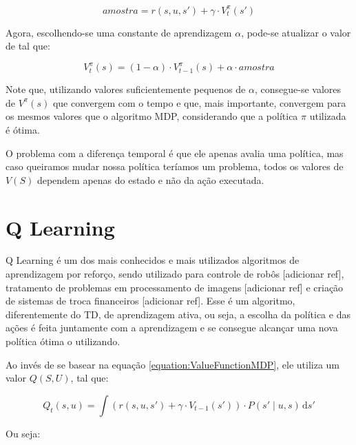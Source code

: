 \begin{equation} \label{equation:AmostraTD}
	amostra = r \left( s, u, s' \right) + \gamma \cdot V_t^\pi \left( s' \right)
\end{equation}

Agora, escolhendo-se uma constante de aprendizagem $ \alpha $, pode-se atualizar o valor de  tal que:

\begin{equation} \label{equation:UpdateValueFunctionTD}
	V_t^\pi \left( s \right) = \left( 1 - \alpha \right) \cdot V_{t-1}^\pi \left( s \right) + \alpha \cdot amostra
\end{equation}

Note que, utilizando valores suficientemente pequenos de $ \alpha $, consegue-se valores de $ V^\pi \left( s \right) $ que convergem com o tempo e que, mais importante, convergem para os mesmos valores que o algoritmo MDP, considerando que a política $ \pi $ utilizada é ótima.

O problema com a diferença temporal é que ele apenas avalia uma política, mas caso queiramos mudar nossa política teríamos um problema, todos os valores de $ V \left( S \right) $ dependem apenas do estado e não da ação executada.

\section{Q Learning}

Q Learning é um dos mais conhecidos e mais utilizados algoritmos de aprendizagem por reforço, sendo utilizado para controle de robôs [adicionar ref], tratamento de problemas em processamento de imagens [adicionar ref] e criação de sistemas de troca financeiros [adicionar ref]. Esse é um algoritmo, diferentemente do TD, de aprendizagem ativa, ou seja, a escolha da política e das ações é feita juntamente com a aprendizagem e se consegue alcançar uma nova política ótima o utilizando.

Ao invés de se basear na equação \ref{equation:ValueFunctionMDP}, ele utiliza um valor $ Q \left( S, U \right) $, tal que:

\begin{equation} \label{equation:QValueFunctionQLearning}
    Q_t \left( s, u \right) = \int \! \left( r \left( s, u, s' \right) + \gamma \cdot V_{t-1} \left( s' \right) \right) \cdot P \left( s' \mid u, s \right) \, \mathrm{d}s'
\end{equation}

Ou seja:

